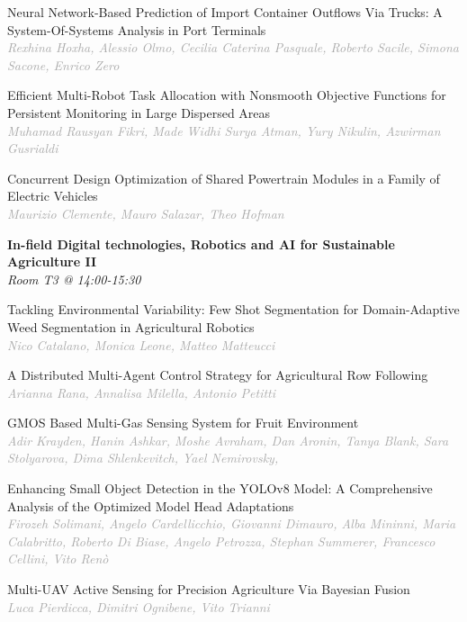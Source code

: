 \begin{multicols*}{2}
\small Neural Network-Based Prediction of Import Container Outflows Via Trucks: A System-Of-Systems Analysis in Port Terminals\\ 
\footnotesize \textcolor{darkgray}{\textit{Rexhina Hoxha, Alessio  Olmo, Cecilia Caterina  Pasquale, Roberto  Sacile, Simona  Sacone, Enrico  Zero}}

\small Efficient Multi-Robot Task Allocation with Nonsmooth Objective Functions for Persistent Monitoring in Large Dispersed Areas\\ 
\footnotesize \textcolor{darkgray}{\textit{Muhamad Rausyan Fikri, Made Widhi Surya  Atman, Yury  Nikulin, Azwirman  Gusrialdi}}

\small Concurrent Design Optimization of Shared Powertrain Modules in a Family of Electric Vehicles\\ 
\footnotesize \textcolor{darkgray}{\textit{Maurizio Clemente, Mauro  Salazar, Theo  Hofman}}

\normalsize \textbf{In-field Digital technologies, Robotics and AI for Sustainable Agriculture II}\\
\small \textit{Room T3 @ 14:00-15:30}

\small Tackling Environmental Variability: Few Shot Segmentation for Domain-Adaptive Weed Segmentation in Agricultural Robotics\\ 
\footnotesize \textcolor{darkgray}{\textit{Nico Catalano, Monica  Leone, Matteo  Matteucci}}

\small A Distributed Multi-Agent Control Strategy for Agricultural Row Following\\ 
\footnotesize \textcolor{darkgray}{\textit{Arianna Rana, Annalisa  Milella, Antonio  Petitti}}

\small GMOS Based Multi-Gas Sensing System for Fruit Environment\\ 
\footnotesize \textcolor{darkgray}{\textit{Adir Krayden, Hanin  Ashkar, Moshe  Avraham, Dan  Aronin, Tanya  Blank, Sara  Stolyarova, Dima  Shlenkevitch, Yael  Nemirovsky,}}

\small Enhancing Small Object Detection in the YOLOv8 Model: A Comprehensive Analysis of the Optimized Model Head Adaptations\\ 
\footnotesize \textcolor{darkgray}{\textit{Firozeh Solimani, Angelo  Cardellicchio, Giovanni  Dimauro, Alba  Mininni, Maria  Calabritto, Roberto  Di Biase, Angelo  Petrozza, Stephan  Summerer, Francesco  Cellini, Vito  Renò}}

\small Multi-UAV Active Sensing for Precision Agriculture Via Bayesian Fusion\\ 
\footnotesize \textcolor{darkgray}{\textit{Luca Pierdicca, Dimitri  Ognibene, Vito  Trianni}}


\end{multicols*}
